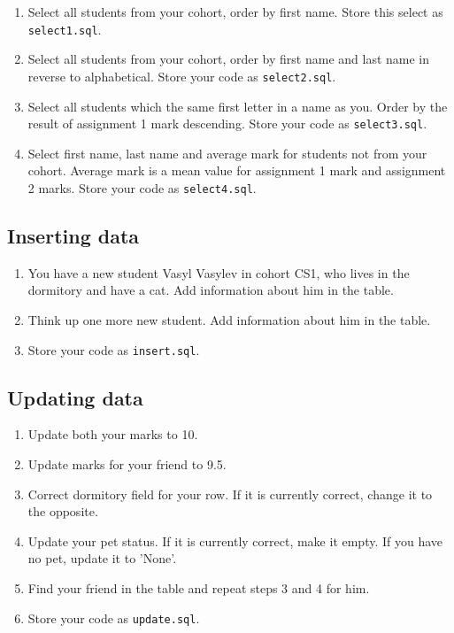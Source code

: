 \documentclass[12pt]{article}
\newcommand{\code}[1]{\texttt{#1}}
\begin{document}
\begin{enumerate}
\item Select all students from your cohort, order by first name. Store this select as \code{select1.sql}.

\item Select all students from your cohort, order by first name and last name  in reverse to alphabetical. Store your code as \code{select2.sql}.

\item Select all students which the same first letter in a name as you. Order by the result of assignment 1 mark descending. Store your code as \code{select3.sql}.

\item Select first name, last name and average mark for students not from your cohort. Average mark is a mean value for assignment 1 mark and assignment 2 marks. Store your code as \code{select4.sql}.

\end{enumerate}

\subsection*{Inserting data}

\begin{enumerate}

\item You have a new student Vasyl Vasylev in cohort CS1, who lives in the dormitory and have a cat. Add information about him in the table.

\item Think up one more new student. Add information about him in the table.

\item Store your code as \code{insert.sql}.

\end{enumerate}

\subsection*{Updating data}

\begin{enumerate}

\item Update both your marks to 10.

\item Update marks for your friend to 9.5.

\item Correct dormitory field for your row. If it is currently correct, change it to the opposite.

\item Update your pet status. If it is currently correct, make it empty. If you have no pet, update it to 'None'.

\item Find your friend in the table and repeat steps 3 and 4 for him.

\item Store your code as \code{update.sql}.

\end{enumerate}
\end{document}
